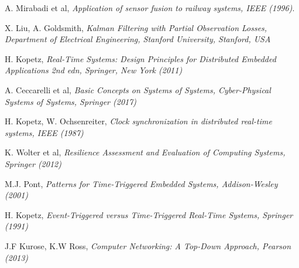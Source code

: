 \begin{thebibliography}{9}

A. Mirabadi et al, \textit{Application of sensor fusion to railway systems, IEEE (1996)}.

X. Liu, A. Goldsmith, \textit{
Kalman  Filtering with Partial Observation Losses, Department of Electrical Engineering, Stanford University, Stanford, USA}

H. Kopetz, \textit{Real-Time Systems: Design Principles for Distributed Embedded Applications 2nd edn, Springer, New York (2011)}

A. Ceccarelli et al, \emph{Basic Concepts on Systems of Systems, Cyber-Physical Systems of Systems, Springer (2017)}

H. Kopetz, W. Ochsenreiter, \textit{Clock synchronization in distributed real-time systems, IEEE (1987)}

K. Wolter et al,
\textit{Resilience Assessment and Evaluation of Computing Systems, Springer (2012)}

M.J. Pont, \emph{Patterns for Time-Triggered Embedded Systems, Addison-Wesley (2001)}

H. Kopetz, \emph{Event-Triggered versus Time-Triggered Real-Time Systems, Springer (1991)}

J.F Kurose, K.W Ross, \emph{Computer Networking: A Top-Down Approach, Pearson (2013)}

\end{thebibliography}